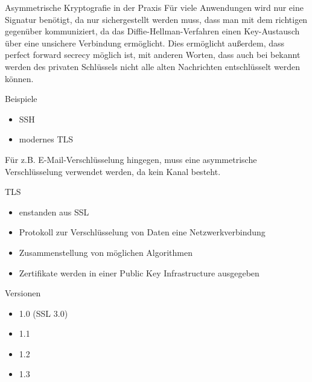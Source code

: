 \documentclass[10pt]{beamer}
\begin{document}
	\begin{frame}{Asymmetrische Kryptografie in der Praxis}
		Für viele Anwendungen wird nur eine Signatur benötigt, da nur sichergestellt werden muss, dass man mit dem richtigen gegenüber kommuniziert, da das Diffie-Hellman-Verfahren einen Key-Austausch über eine unsichere Verbindung ermöglicht. Dies ermöglicht außerdem, dass perfect forward secrecy möglich ist, mit anderen Worten, dass auch bei bekannt werden des privaten Schlüssels nicht alle alten Nachrichten entschlüsselt werden können.
		
		\begin{alertblock}{Beispiele}
			\begin{itemize}
				\item SSH
				\item modernes TLS
			\end{itemize}
		\end{alertblock}
		
		Für z.B. E-Mail-Verschlüsselung hingegen, muss eine asymmetrische Verschlüsselung verwendet werden, da kein Kanal besteht.
	\end{frame}

	\begin{frame}{TLS}
		\begin{itemize}
			\item enstanden aus SSL
			\item Protokoll zur Verschlüsselung von Daten eine Netzwerkverbindung
			\item Zusammenstellung von möglichen Algorithmen
			\item Zertifikate werden in einer Public Key Infrastructure ausgegeben
		\end{itemize}
		\begin{alertblock}{Versionen}
			\begin{itemize}
				\color{red}
				\item 1.0 (SSL 3.0)
				\item 1.1
				\color{darkgreen}
				\item 1.2
				\item 1.3
			\end{itemize}
		\end{alertblock}
	\end{frame}
\end{document}

